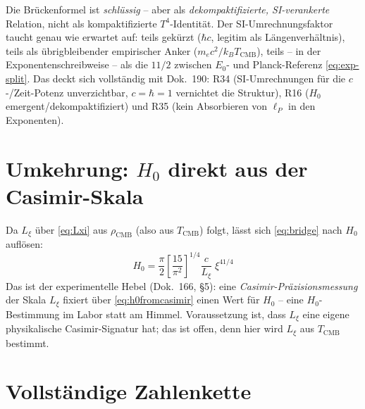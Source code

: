 Die Brückenformel ist \emph{schlüssig} -- aber als \emph{dekompaktifizierte,
SI-verankerte} Relation, nicht als kompaktifizierte $T^4$-Identität. Der
SI-Umrechnungsfaktor taucht genau wie erwartet auf: teils gekürzt ($\hbar c$,
legitim als Längenverhältnis), teils als übrigbleibender empirischer Anker
($m_e c^2/k_B T_\text{CMB}$), teils -- in der Exponentenschreibweise -- als die
$11/2$ zwischen $E_0$- und Planck-Referenz \eqref{eq:exp-split}. Das deckt sich
vollständig mit Dok.~190: R34 (SI-Umrechnungen für die $c$-/Zeit-Potenz
unverzichtbar, $c=\hbar=1$ vernichtet die Struktur), R16 ($H_0$
emergent/dekompaktifiziert) und R35 (kein Absorbieren von $\ell_P$ in den
Exponenten).

\section{Umkehrung: $H_0$ direkt aus der Casimir-Skala}

Da $L_\xi$ über \eqref{eq:Lxi} aus $\rho_\text{CMB}$ (also aus $T_\text{CMB}$)
folgt, lässt sich \eqref{eq:bridge} nach $H_0$ auflösen:
\begin{equation}
  \boxed{\;H_0 = \frac{\pi}{2}\left[\frac{15}{\pi^2}\right]^{1/4}
  \frac{c}{L_\xi}\;\xi^{41/4}\;}
  \label{eq:h0fromcasimir}
\end{equation}
Das ist der experimentelle Hebel (Dok.~166, §5): eine
\emph{Casimir-Präzisionsmessung} der Skala $L_\xi$ fixiert über
\eqref{eq:h0fromcasimir} einen Wert für $H_0$ -- eine $H_0$-Bestimmung im
Labor statt am Himmel. Voraussetzung ist, dass $L_\xi$ eine eigene
physikalische Casimir-Signatur hat; das ist offen, denn hier wird $L_\xi$ aus
$T_\text{CMB}$ bestimmt.

\section{Vollständige Zahlenkette}

